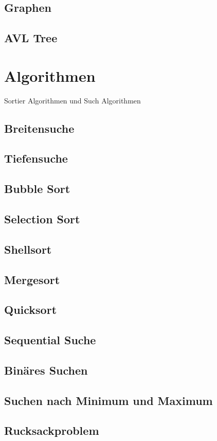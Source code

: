 \documentclass{book}
\begin{document}
\section{Graphen}
\section{AVL Tree}

\chapter{Algorithmen}
Sortier Algorithmen und Such Algorithmen
\section{Breitensuche}
\section{Tiefensuche}
\section{Bubble Sort}
\section{Selection Sort}
\section{Shellsort}
\section{Mergesort}
\section{Quicksort}
\section{Sequential Suche}
\section{Binäres Suchen}
\section{Suchen nach Minimum und Maximum}
\section{Rucksackproblem}
\end{document}
